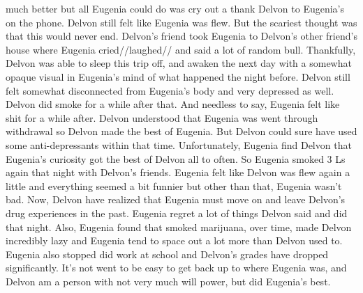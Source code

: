 \documentclass[12pt]{book}
\begin{document}
much better but all Eugenia could do was cry out a thank Delvon to Eugenia's on the phone. Delvon still felt like Eugenia was flew. But the scariest thought was that this would never end. Delvon's friend took Eugenia to Delvon's other friend's house where Eugenia cried//laughed// and said a lot of random bull. Thankfully, Delvon was able to sleep this trip off, and awaken the next day with a somewhat opaque visual in Eugenia's mind of what happened the night before. Delvon still felt somewhat disconnected from Eugenia's body and very depressed as well. Delvon did smoke for a while after that. And needless to say, Eugenia felt like shit for a while after. Delvon understood that Eugenia was went through withdrawal so Delvon made the best of Eugenia. But Delvon could sure have used some anti-depressants within that time. Unfortunately, Eugenia find Delvon that Eugenia's curiosity got the best of Delvon all to often. So Eugenia smoked 3 Ls again that night with Delvon's friends. Eugenia felt like Delvon was flew again a little and everything seemed a bit funnier but other than that, Eugenia wasn't bad. Now, Delvon have realized that Eugenia must move on and leave Delvon's drug experiences in the past. Eugenia regret a lot of things Delvon said and did that night. Also, Eugenia found that smoked marijuana, over time, made Delvon incredibly lazy and Eugenia tend to space out a lot more than Delvon used to. Eugenia also stopped did work at school and Delvon's grades have dropped significantly. It's not went to be easy to get back up to where Eugenia was, and Delvon am a person with not very much will power, but did Eugenia's best.
\end{document}
